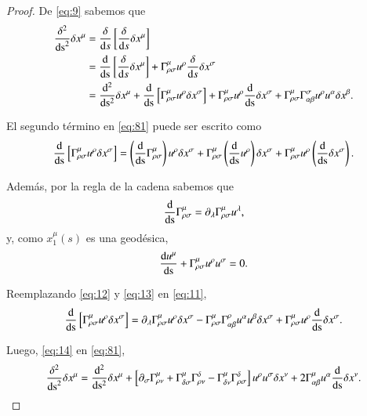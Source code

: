 \begin{proof}

De \eqref{eq:9} sabemos que
\begin{align}
\frac{\delta^2}{\mathrm{ds}^2}\delta x^{\mu} &= \frac{\delta  }{\mathrm{d}s} \left[ \frac{\delta  }{\mathrm{d}s} \delta x^{\mu} \right] \nonumber \\
&= \dv{ }{ \mathrm{s} } \left[ \frac{\delta  }{\mathrm{d}s} \delta x^{\mu} \right] + \Gamma^{\mu}_{\rho \sigma} u^{\rho} \frac{\delta  }{\mathrm{d}s} \delta x^{\sigma} \nonumber \\
\label{eq:81}
&= \dv[2]{ }{ \mathrm{s} } \delta x^{\mu} + \dv{ }{ \mathrm{s} } \left[ \Gamma^{\mu}_{\rho \sigma} u^{\rho} \delta x^{\sigma} \right] + \Gamma^{\mu}_{\rho \sigma} u^{\rho} \dv{ }{ \mathrm{s} }\delta x^{\sigma} + \Gamma^{\mu}_{\rho \sigma} \Gamma^{\sigma}_{\alpha \beta} u^{\rho} u^{\alpha} \delta x^{\beta}.
\end{align}

El segundo término en \eqref{eq:81} puede ser escrito como
\begin{equation}
\label{eq:11}
\dv{ }{ \mathrm{s} } \left[ \Gamma^{\mu}_{\rho \sigma} u^{\rho} \delta x^{\sigma} \right]
=
\left( \dv{ }{ \mathrm{s} } \Gamma^{\mu}_{\rho \sigma} \right) u^{\rho} \delta x^{\sigma} + \Gamma^{\mu}_{\rho \sigma} \left(  \dv{ }{ \mathrm{s} } u^{\rho} \right) \delta x^{\sigma} + \Gamma^{\mu}_{\rho \sigma} u^{\rho} \left( \dv{ }{ \mathrm{s} } \delta x^{\sigma} \right).
\end{equation}

Además, por la regla de la cadena sabemos que
\begin{equation}
\label{eq:12}
\dv{ }{\mathrm{s}} \Gamma^{\mu}_{\rho \sigma} = \partial_{\lambda} \Gamma^{\mu}_{\rho \sigma} u^{\lambda},
\end{equation}
y, como $x_1^{\mu}(s)$ es una geodésica,
\begin{equation}
\label{eq:13}
\dv{u^{\mu}}{\mathrm{s}} + \Gamma^{\mu}_{\rho \sigma} u^{\rho} u^{\sigma} = 0.
\end{equation}

Reemplazando \eqref{eq:12} y \eqref{eq:13} en \eqref{eq:11},
\begin{equation}
\label{eq:14}
\dv{ }{ \mathrm{s} } \left[ \Gamma^{\mu}_{\rho \sigma} u^{\rho} \delta x^{\sigma} \right]
=
\partial_{\lambda} \Gamma^{\mu}_{\rho \sigma} u^{\rho} \delta x^{\sigma} - \Gamma^{\mu}_{\rho \sigma} \Gamma^{\rho}_{\alpha \beta} u^{\alpha} u^{\beta} \delta x^{\sigma} + \Gamma^{\mu}_{\rho \sigma} u^{\rho} \dv{ }{ \mathrm{s} } \delta x^{\sigma}.
\end{equation}

Luego, \eqref{eq:14} en \eqref{eq:81},
\begin{equation}
\label{eq:15}
\frac{\delta^2}{\mathrm{ds}^2}\delta x^{\mu} = \dv[2]{ }{\mathrm{s}} \delta x^{\mu} + 
\left[ \partial_{\sigma} \Gamma^{\mu}_{\rho \nu} + \Gamma^{\mu}_{\delta \sigma} \Gamma^{\delta}_{\rho \nu} - \Gamma^{\mu}_{\delta \nu} \Gamma^{\delta}_{\rho \sigma}  \right] u^{\rho} u^{\sigma} \delta x^{\nu} + 2\Gamma^{\mu}_{\alpha \beta} u^{\alpha} \dv{ }{\mathrm{s}} \delta x^{\nu}.
\end{equation}


\end{proof}
